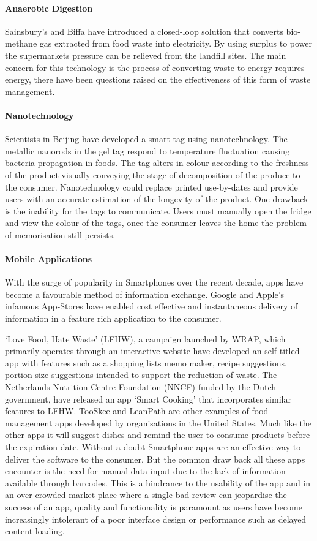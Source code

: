 \documentclass[a4paper, 11pt]{article}
\begin{document}
\paragraph{Anaerobic Digestion}
Sainsbury's and Biffa have introduced a closed-loop solution that converts bio-methane gas extracted from food waste into electricity. By using surplus to power the supermarkets pressure can be relieved from the landfill sites. The main concern for this technology is the process of converting waste to energy requires energy, there have been questions raised on the effectiveness of this form of waste management.\cite{anarobic} 

\paragraph{Nanotechnology}
Scientists in Beijing have developed a smart tag using nanotechnology. The metallic nanorods in the gel tag respond to temperature fluctuation causing bacteria propagation in foods. The tag alters in colour according to the freshness of the product visually conveying the stage of decomposition of the produce to the consumer. Nanotechnology could replace printed use-by-dates and provide users with an accurate estimation of the longevity of the product. One drawback is the inability for the tags to communicate. Users must manually open the fridge and view the colour of the tags, once the consumer leaves the home the problem of memorisation still persists.\cite{FoodWaste}

\paragraph{Mobile Applications}
With the surge of popularity in Smartphones over the recent decade, apps have become a favourable method of information exchange. Google and Apple's infamous App-Stores have enabled cost effective and instantaneous delivery of information in a feature rich application to the consumer.

`Love Food, Hate Waste' (LFHW), a campaign launched by WRAP, which primarily operates through an interactive website have developed an self titled app with features such as a shopping lists memo maker, recipe suggestions, portion size suggestions intended to support the reduction of waste. The Netherlands Nutrition Centre Foundation (NNCF) funded by the Dutch government, have released an app `Smart Cooking' that incorporates similar features to LFHW. TooSkee and LeanPath\cite{FoodWaste} are other examples of food management apps developed by organisations in the United States. Much like the other apps it will suggest dishes and remind the user to consume products before the expiration date. Without a doubt Smartphone apps are an effective way to deliver the software to the consumer, But the common draw back all these apps encounter is the need for manual data input due to the lack of information available through barcodes. This is a hindrance to the usability of the app and in an over-crowded market place where a single bad review can jeopardise the success of an app, quality and functionality is paramount as users have become increasingly intolerant of a poor interface design or performance such as delayed content loading.
\end{document}
